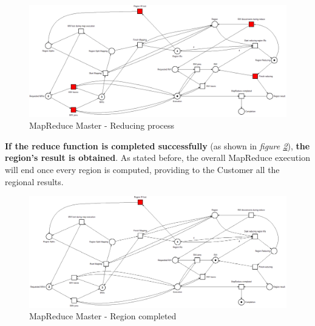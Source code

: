 \begin{figure}[!ht]
    \centering
    \includegraphics[width=\linewidth]{document/chapters/chapter_5/images/master_petri_net_4.png}
    \caption{MapReduce Master - Reducing process}
    \label{fig:master_petri_net_4}
\end{figure}

\textbf{If the reduce function is completed successfully} (as shown in \textit{figure \ref{fig:master_petri_net_5}}), \textbf{the region's result is obtained}. As stated before, the overall MapReduce execution will end once every region is computed, providing to the Customer all the regional results. 

\begin{figure}[!ht]
    \centering
    \includegraphics[width=\linewidth]{document/chapters/chapter_5/images/master_petri_net_5.png}
    \caption{MapReduce Master - Region completed}
    \label{fig:master_petri_net_5}
\end{figure}